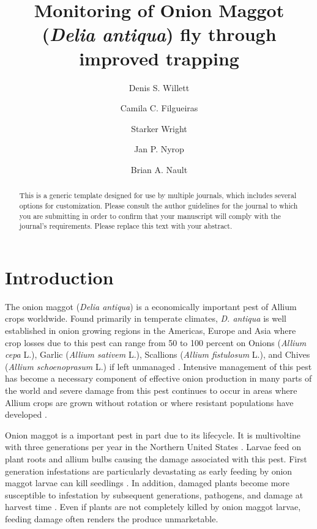 \documentclass[alpha-refs]{wiley-article}
\title{Monitoring of Onion Maggot (\textit{Delia antiqua}) fly through improved trapping}
\author[1\authfn{1}]{Denis S. Willett}
\author[1\authfn{1}]{Camila C. Filgueiras}
\author[2]{Starker Wright}
\author[1]{Jan P. Nyrop}
\author[1]{Brian A. Nault}
\affil[1]{Department of Entomology, Cornell AgriTech, Cornell University, Geneva, NY, 14456, USA}
\affil[2]{Bartlett Tree Experts, Dublin, PA, USA}
\begin{document}
\maketitle

\begin{abstract}
This is a generic template designed for use by multiple journals, which includes several options for customization. Please consult the author guidelines for the journal to which you are submitting in order to confirm that your manuscript will comply with the journal's requirements. Please replace this text with your abstract.

\end{abstract}

\section{Introduction}

The onion maggot (\textit{Delia antiqua}) is a economically important pest of Allium crops worldwide.  Found primarily in temperate climates, \textit{D. antiqua} is well established in onion growing regions in the Americas, Europe and Asia where crop losses due to this pest can range from 50 to 100 percent on Onions (\textit{Allium cepa} L.), Garlic (\textit{Allium sativem} L.), Scallions (\textit{Allium fistulosum} L.), and Chives (\textit{Allium schoenoprasum} L.) if left unmanaged \citep{ellis1979factors,ning2017predicting,nault2007ecology, nault2006performance, nault2006onion}.  Intensive management of this pest has become a necessary component of effective onion production in many parts of the world and severe damage from this pest continues to occur in areas where Allium crops are grown without rotation or where resistant populations have developed \citep{martinson1988dispersal, nault2006onion}.  

Onion maggot is a important pest in part due to its lifecycle.  It is multivoltine with three generations per year in the Northern United States \citep{eckenrode1975population, hoepting2004insecticide}.  Larvae feed on plant roots and allium bulbs causing the damage associated with this pest.  First generation infestations are particularly devastating as early feeding by onion maggot larvae can kill seedlings \citep{nault2006onion, nault2006performance}.  In addition, damaged plants become more susceptible to infestation by subsequent generations, pathogens, and damage at harvest time \citep{eckenrode1986impact,nault2006performance}.  Even if plants are not completely killed by onion maggot larvae, feeding damage often renders the produce unmarketable.  
\end{document}
